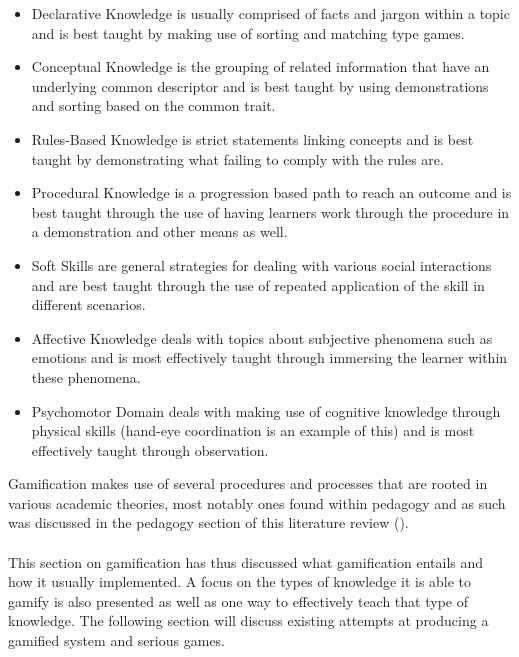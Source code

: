\begin{itemize}
\item Declarative Knowledge is usually comprised of facts and jargon within a topic and is best taught by making use of sorting and matching type games.
\item Conceptual Knowledge is the grouping of related information that have an underlying common descriptor and is best taught by using demonstrations and sorting based on the common trait.
\item Rules-Based Knowledge is strict statements linking concepts and is best taught by demonstrating what failing to comply with the rules are.
\item Procedural Knowledge is a progression based path to reach an outcome and is best taught through the use of having learners work through the procedure in a demonstration and other means as well.
\item Soft Skills are general strategies for dealing with various social interactions and are best taught through the use of repeated application of the skill in different scenarios.
\item Affective Knowledge deals with topics about subjective phenomena such as emotions and is most effectively taught through immersing the learner within these phenomena.

\item Psychomotor Domain deals with making use of cognitive knowledge through physical skills (hand-eye coordination is an example of this) and is most effectively taught through observation.
\end{itemize}
Gamification makes use of several procedures and processes that are rooted in various academic theories, most notably ones found within pedagogy and as such was discussed in the pedagogy section of this literature review (\cite{KappArticle2012}).
\\\\
This section on gamification has thus discussed what gamification entails and how it usually implemented. A focus on the types of knowledge it is able to gamify is also presented as well as one way to effectively teach that type of knowledge. The following section will discuss existing attempts at producing a gamified system and serious games.
\newpage
